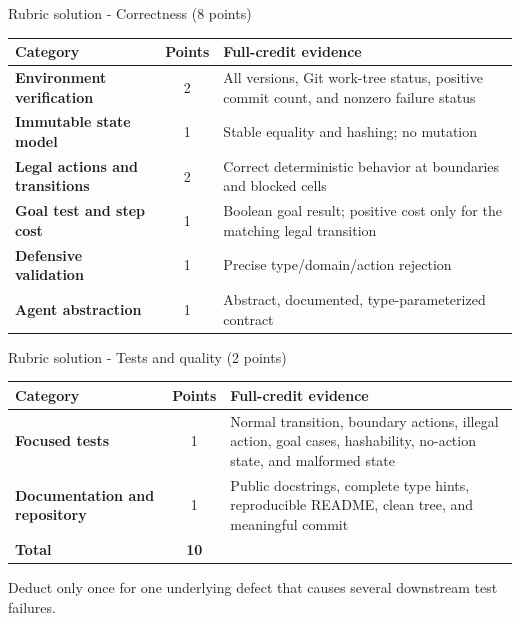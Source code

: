 \documentclass[aspectratio=169,11pt]{beamer}
\begin{document}
\begin{frame}{Rubric solution - Correctness (8 points)}
  \scriptsize
  \begin{tabularx}{\textwidth}{>{\bfseries}p{} c X}
    \toprule
    Category & Points & Full-credit evidence \\
    \midrule
    Environment verification & 2 & All versions, Git work-tree status, positive
      commit count, and nonzero failure status \\
    Immutable state model & 1 & Stable equality and hashing; no mutation \\
    Legal actions and transitions & 2 & Correct deterministic behavior at
      boundaries and blocked cells \\
    Goal test and step cost & 1 & Boolean goal result; positive cost only for the
      matching legal transition \\
    Defensive validation & 1 & Precise type/domain/action rejection \\
    Agent abstraction & 1 & Abstract, documented, type-parameterized contract \\
    \bottomrule
  \end{tabularx}
\end{frame}

\begin{frame}{Rubric solution - Tests and quality (2 points)}
  \scriptsize
  \begin{tabularx}{\textwidth}{>{\bfseries}p{} c X}
    \toprule
    Category & Points & Full-credit evidence \\
    \midrule
    Focused tests & 1 & Normal transition, boundary actions, illegal action,
      goal cases, hashability, no-action state, and malformed state \\
    Documentation and repository & 1 & Public docstrings, complete type hints,
      reproducible README, clean tree, and meaningful commit \\
    \midrule
    \textbf{Total} & \textbf{10} & \\
    \bottomrule
  \end{tabularx}

  \vspace{0.35cm}
  \gradinglabel Deduct only once for one underlying defect that causes several
  downstream test failures.
\end{frame}
\end{document}
